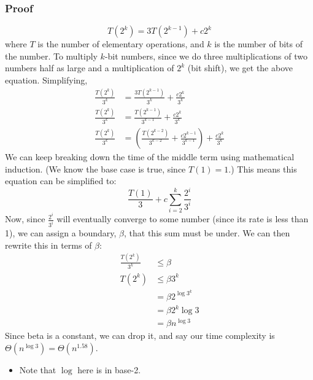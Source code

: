 \documentclass[10pt]{article}
\begin{document}
\subsubsection*{Proof}
\[T(2^k) = 3T(2^{k - 1}) + c 2^k\]
where $T$ is the number of elementary operations, and $k$ is the number of bits of the number.  To multiply $k$-bit numbers, since we do three multiplications of two numbers half as large and a multiplication of $2^k$ (bit shift), we get the above equation.  Simplifying,
\begin{align*}
    \frac{T(2^k)}{3^k} &= \frac{3T(2^{k - 1})}{3^k} + \frac{c 2^k}{3^k}\\
    \frac{T(2^k)}{3^k} &= \frac{T(2^{k - 1})}{3^{k - 1}} + \frac{c 2^k}{3^k}\\
    \frac{T(2^k)}{3^k} &= \left(\frac{T(2^{k - 2})}{3^{k - 2}} + \frac{c 2^{k - 1}}{3^{k - 1}}\right) + \frac{c 2^k}{3^k}
\end{align*}
We can keep breaking down the time of the middle term using mathematical induction.  (We know the base case is true, since $T(1) = 1$.)  This means this equation can be simplified to:
\[\frac{T(1)}{3} + c \sum_{i = 2}^k \frac{2^i}{3^i}\]
Now, since $\frac{2^i}{3^i}$ will eventually converge to some number (since its rate is less than 1), we can assign a boundary, $\beta$, that this sum must be under.  We can then rewrite this in terms of $\beta$:
\begin{align*}
    \frac{T(2^k)}{3^k} &\leq \beta\\
    T(2^k) &\leq \beta 3^k\\
    &= \beta 2^{\log 3^k} \\
    &= \beta 2^k \log 3 \\
    &= \beta n^{\log 3}
\end{align*}
Since beta is a constant, we can drop it, and say our time complexity is $\Theta(n^{\log 3}) = \Theta(n^{1.58})$.
\begin{itemize}
	\item Note that $\log$ here is in base-2.
\end{itemize}
\end{document}
